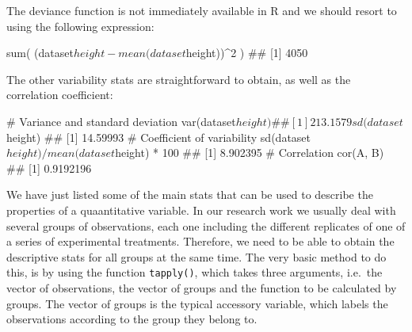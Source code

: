 \documentclass[a4paper,12pt,oneside]{book}
\newenvironment{Shaded}{\begin{snugshade}}{\end{snugshade}}
\newcommand{\DecValTok}[1]{#1}
\newcommand{\SpecialCharTok}[1]{#1}
\newcommand{\CommentTok}[1]{#1}
\newcommand{\DocumentationTok}[1]{#1}
\newcommand{\OtherTok}[1]{#1}
\newcommand{\FunctionTok}[1]{#1}
\newcommand{\AttributeTok}[1]{#1}
\newcommand{\NormalTok}[1]{#1}
\begin{document}
The deviance function is not immediately available in R and we should resort to using the following expression:

\begin{Shaded}
\begin{Highlighting}[]
\FunctionTok{sum}\NormalTok{( (dataset}\SpecialCharTok{$}\NormalTok{height }\SpecialCharTok{{-}} \FunctionTok{mean}\NormalTok{(dataset}\SpecialCharTok{$}\NormalTok{height))}\SpecialCharTok{\^{}}\DecValTok{2}\NormalTok{ )}
\DocumentationTok{\#\# [1] 4050}
\end{Highlighting}
\end{Shaded}

The other variability stats are straightforward to obtain, as well as the correlation coefficient:

\begin{Shaded}
\begin{Highlighting}[]
\CommentTok{\# Variance and standard deviation}
\FunctionTok{var}\NormalTok{(dataset}\SpecialCharTok{$}\NormalTok{height)}
\DocumentationTok{\#\# [1] 213.1579}
\FunctionTok{sd}\NormalTok{(dataset}\SpecialCharTok{$}\NormalTok{height)}
\DocumentationTok{\#\# [1] 14.59993}
\CommentTok{\# Coefficient of variability}
\FunctionTok{sd}\NormalTok{(dataset}\SpecialCharTok{$}\NormalTok{height)}\SpecialCharTok{/}\FunctionTok{mean}\NormalTok{(dataset}\SpecialCharTok{$}\NormalTok{height) }\SpecialCharTok{*} \DecValTok{100}
\DocumentationTok{\#\# [1] 8.902395}
\CommentTok{\# Correlation}
\FunctionTok{cor}\NormalTok{(A, B)}
\DocumentationTok{\#\# [1] 0.9192196}
\end{Highlighting}
\end{Shaded}

We have just listed some of the main stats that can be used to describe the properties of a quaantitative variable. In our research work we usually deal with several groups of observations, each one including the different replicates of one of a series of experimental treatments. Therefore, we need to be able to obtain the descriptive stats for all groups at the same time. The very basic method to do this, is by using the function \texttt{tapply()}, which takes three arguments, i.e.~the vector of observations, the vector of groups and the function to be calculated by groups. The vector of groups is the typical accessory variable, which labels the observations according to the group they belong to.

\begin{Shaded}
\end{Shaded}
\end{document}
